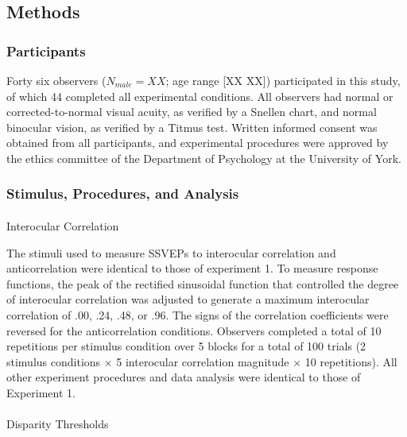 \documentclass[
  12pt,
]{article}
\makeatletter
\let\oldparagraph\paragraph
\renewcommand{\paragraph}{
    \@ifstar
      \xxxParagraphStar
      \xxxParagraphNoStar
  }
\newcommand{\xxxParagraphStar}[1]{\oldparagraph*{#1}\mbox{}}
\newcommand{\xxxParagraphNoStar}[1]{\oldparagraph{#1}\mbox{}}
\makeatother
\begin{document}
\subsection{Methods}\label{methods-1}

\subsubsection{Participants}\label{participants-1}

Forty six observers (\(N_{male} = XX\); age range {[}XX XX{]})
participated in this study, of which 44 completed all experimental
conditions. All observers had normal or corrected-to-normal visual
acuity, as verified by a Snellen chart, and normal binocular vision, as
verified by a Titmus test. Written informed consent was obtained from
all participants, and experimental procedures were approved by the
ethics committee of the Department of Psychology at the University of
York.

\subsubsection{Stimulus, Procedures, and
Analysis}\label{stimulus-procedures-and-analysis}

\paragraph{Interocular Correlation}\label{interocular-correlation-1}

The stimuli used to measure SSVEPs to interocular correlation and
anticorrelation were identical to those of experiment 1. To measure
response functions, the peak of the rectified sinusoidal function that
controlled the degree of interocular correlation was adjusted to
generate a maximum interocular correlation of .00, .24, .48, or .96. The
signs of the correlation coefficients were reversed for the
anticorrelation conditions. Observers completed a total of 10
repetitions per stimulus condition over 5 blocks for a total of 100
trials (2 stimulus conditions \(\times\) 5 interocular correlation
magnitude \(\times\) 10 repetitions). All other experiment procedures
and data analysis were identical to those of Experiment 1.

\paragraph{Disparity Thresholds}\label{disparity-thresholds-2}
\end{document}
